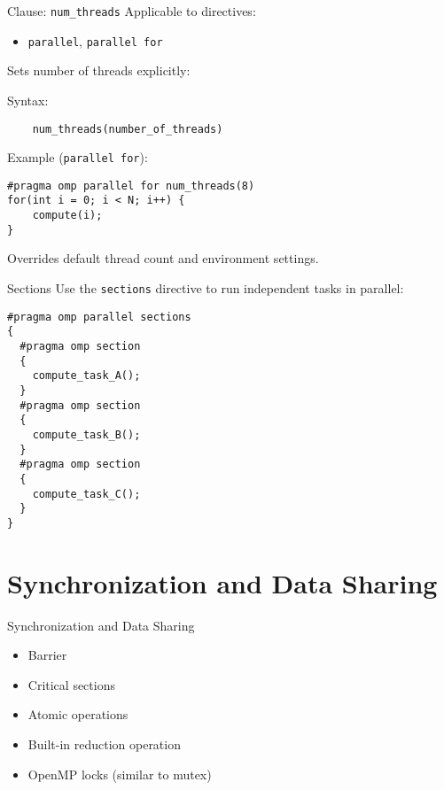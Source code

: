\documentclass{beamer}
\begin{document}
\begin{frame}[fragile]{Clause: \texttt{num\_threads}}
  Applicable to directives:
  \begin{itemize}
    \item \texttt{parallel}, \texttt{parallel for}
  \end{itemize}

  Sets number of threads explicitly:

  Syntax:
  \begin{verbatim}
    num_threads(number_of_threads)
  \end{verbatim}

  Example (\texttt{parallel for}):
  \lstset{style=CStyle}
  \begin{lstlisting}
#pragma omp parallel for num_threads(8)
for(int i = 0; i < N; i++) {
    compute(i);
}
  \end{lstlisting}

  Overrides default thread count and environment settings.
\end{frame}


\begin{frame}[fragile]{Sections}
  Use the \texttt{sections} directive to run independent tasks in parallel:

  \lstset{style=CStyle}
  \begin{lstlisting}
#pragma omp parallel sections
{
  #pragma omp section
  {
    compute_task_A();
  }
  #pragma omp section
  {
    compute_task_B();
  }
  #pragma omp section
  {
    compute_task_C();
  }
}
  \end{lstlisting}
\end{frame}

\section{Synchronization and Data Sharing}
\begin{frame}{Synchronization and Data Sharing}
  \begin{itemize}
    \item Barrier
    \item Critical sections
    \item Atomic operations
    \item Built-in reduction operation
    \item OpenMP locks (similar to mutex)
  \end{itemize}
\end{frame}
\end{document}
